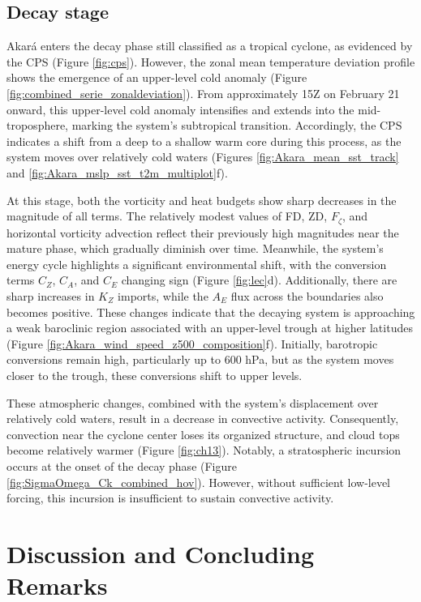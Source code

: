 \documentclass[pdflatex,sn-chicago]{sn-jnl}%
\theoremstyle{plain}
\theoremstyle{definition}
\theoremstyle{remark}
\theoremstyle{definition}
\begin{document}
\subsection{Decay stage}

Akará enters the decay phase still classified as a tropical cyclone, as evidenced by the CPS (Figure \ref{fig:cps}). However, the zonal mean temperature deviation profile shows the emergence of an upper-level cold anomaly (Figure \ref{fig:combined_serie_zonaldeviation}). From approximately 15Z on February 21 onward, this upper-level cold anomaly intensifies and extends into the mid-troposphere, marking the system's subtropical transition. Accordingly, the CPS indicates a shift from a deep to a shallow warm core during this process, as the system moves over relatively cold waters (Figures \ref{fig:Akara_mean_sst_track} and \ref{fig:Akara_mslp_sst_t2m_multiplot}f).

At this stage, both the vorticity and heat budgets show sharp decreases in the magnitude of all terms. The relatively modest values of FD, ZD, $F_{\zeta}$, and horizontal vorticity advection reflect their previously high magnitudes near the mature phase, which gradually diminish over time. Meanwhile, the system's energy cycle highlights a significant environmental shift, with the conversion terms $C_Z$, $C_A$, and $C_E$ changing sign (Figure \ref{fig:lec}d). Additionally, there are sharp increases in $K_Z$ imports, while the $A_E$ flux across the boundaries also becomes positive. These changes indicate that the decaying system is approaching a weak baroclinic region associated with an upper-level trough at higher latitudes (Figure \ref{fig:Akara_wind_speed_z500_composition}f). Initially, barotropic conversions remain high, particularly up to 600 hPa, but as the system moves closer to the trough, these conversions shift to upper levels.

These atmospheric changes, combined with the system's displacement over relatively cold waters, result in a decrease in convective activity. Consequently, convection near the cyclone center loses its organized structure, and cloud tops become relatively warmer (Figure \ref{fig:ch13}). Notably, a stratospheric incursion occurs at the onset of the decay phase (Figure \ref{fig:SigmaOmega_Ck_combined_hov}). However, without sufficient low-level forcing, this incursion is insufficient to sustain convective activity.


\section{Discussion and Concluding Remarks}
\end{document}
